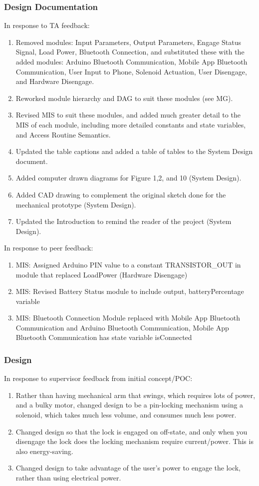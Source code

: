 \documentclass{article}
\begin{document}
\subsubsection{Design Documentation}
In response to TA feedback:
\begin{enumerate}
    \item Removed modules: Input Parameters, Output Parameters, Engage Status Signal, Load Power, Bluetooth Connection, and substituted these with the added modules: Arduino Bluetooth Communication, Mobile App Bluetooth Communication, User Input to Phone, Solenoid Actuation, User Disengage, and Hardware Disengage.
    \item Reworked module hierarchy and DAG to suit these modules (see MG).
    \item Revised MIS to suit these modules, and added much greater detail to the MIS of each module, including more detailed constants and state variables, and Access Routine Semantics.
    \item Updated the table captions and added a table of tables to the System Design document. 
    \item Added computer drawn diagrams for Figure 1,2, and 10 (System Design).
    \item Added CAD drawing to complement the original sketch done for the mechanical prototype (System Design).
    \item Updated the Introduction to remind the reader of the project (System Design).
\end{enumerate}

\noindent In response to peer feedback:
\begin{enumerate}
    \item MIS: Assigned Arduino PIN value to a constant TRANSISTOR\_OUT in module that replaced LoadPower (Hardware Disengage)
    \item MIS: Revised Battery Status module to include output, batteryPercentage variable
    \item MIS: Bluetooth Connection Module replaced with Mobile App Bluetooth Communication and Arduino Bluetooth Communication, Mobile App Bluetooth Communication has state variable isConnected
\end{enumerate}

\subsubsection{Design}
In response to supervisor feedback from initial concept/POC:
\begin{enumerate}
    \item Rather than having mechanical arm that swings, which requires lots of power, and a bulky motor, changed design to be a pin-locking mechanism using a solenoid, which takes much less volume, and consumes much less power.
    \item Changed design so that the lock is engaged on off-state, and only when you disengage the lock does the locking mechanism require current/power. This is also energy-saving.
    \item Changed design to take advantage of the user's power to engage the lock, rather than using electrical power.
\end{enumerate}
\end{document}

